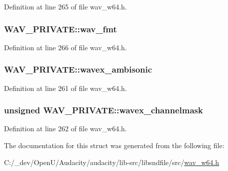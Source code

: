 Definition at line 265 of file wav\+\_\+w64.\+h.

\subsubsection[{\texorpdfstring{wav\+\_\+fmt}{wav_fmt}}]{ W\+A\+V\+\_\+\+P\+R\+I\+V\+A\+T\+E\+::wav\+\_\+fmt}\hypertarget{struct_w_a_v___p_r_i_v_a_t_e_a05bf751d5063777d3e2f437ae8d90fab}{}\label{struct_w_a_v___p_r_i_v_a_t_e_a05bf751d5063777d3e2f437ae8d90fab}


Definition at line 266 of file wav\+\_\+w64.\+h.

\subsubsection[{\texorpdfstring{wavex\+\_\+ambisonic}{wavex_ambisonic}}]{ W\+A\+V\+\_\+\+P\+R\+I\+V\+A\+T\+E\+::wavex\+\_\+ambisonic}\hypertarget{struct_w_a_v___p_r_i_v_a_t_e_a1a0f98e264dd0ad6c031a784ea491f97}{}\label{struct_w_a_v___p_r_i_v_a_t_e_a1a0f98e264dd0ad6c031a784ea491f97}


Definition at line 261 of file wav\+\_\+w64.\+h.

\subsubsection[{\texorpdfstring{wavex\+\_\+channelmask}{wavex_channelmask}}]{\setlength{\rightskip}{0pt plus 5cm}unsigned W\+A\+V\+\_\+\+P\+R\+I\+V\+A\+T\+E\+::wavex\+\_\+channelmask}\hypertarget{struct_w_a_v___p_r_i_v_a_t_e_a203dea4b2d6a828454e71bdf45e2e19f}{}\label{struct_w_a_v___p_r_i_v_a_t_e_a203dea4b2d6a828454e71bdf45e2e19f}


Definition at line 262 of file wav\+\_\+w64.\+h.



The documentation for this struct was generated from the following file\+:\begin{DoxyCompactItemize}
\item 
C\+:/\+\_\+dev/\+Open\+U/\+Audacity/audacity/lib-\/src/libsndfile/src/\hyperlink{wav__w64_8h}{wav\+\_\+w64.\+h}\end{DoxyCompactItemize}
